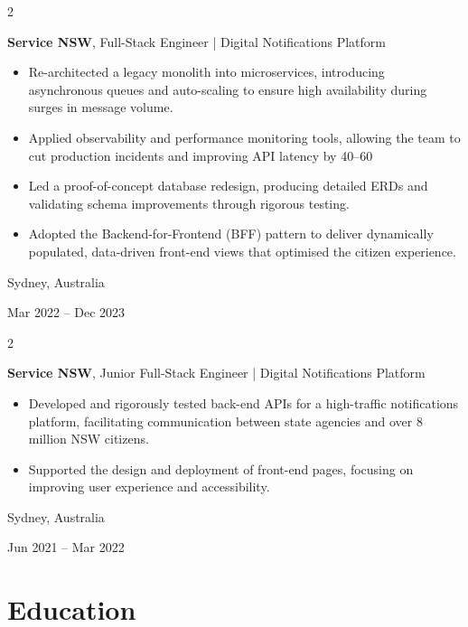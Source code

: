 \documentclass[10pt, a4paper]{article}
\newenvironment{highlights}{
    \begin{itemize}[
        topsep=0.10 cm,
        parsep=0.10 cm,
        partopsep=0pt,
        itemsep=0pt,
        leftmargin=0.4 cm + 10pt
    ]
}{
    \end{itemize}
} %
\newenvironment{twocolentry}[2][]{
    \onecolentry
    \def\secondColumn{#2}
    \setcolumnwidth{\fill, 4.5 cm}
    \begin{paracol}{2}
}{
    \switchcolumn \raggedleft \secondColumn
    \end{paracol}
    \endonecolentry
} %
\begin{document}
        \vspace{0.2 cm}

        \begin{twocolentry}{
            Sydney, Australia

        Mar 2022 – Dec 2023
        }
            \textbf{Service NSW}, Full-Stack Engineer | Digital Notifications Platform
            \begin{highlights}
                \item Re-architected a legacy monolith into microservices, introducing asynchronous queues and auto-scaling to ensure high availability during surges in message volume.
                \item Applied observability and performance monitoring tools, allowing the team to cut production incidents and improving API latency by 40–60%
                \item Led a proof-of-concept database redesign, producing detailed ERDs and validating schema improvements through rigorous testing.
                \item Adopted the Backend-for-Frontend (BFF) pattern to deliver dynamically populated, data-driven front-end views that optimised the citizen experience.
            \end{highlights}
        \end{twocolentry}

        \vspace{0.2 cm}

        \begin{twocolentry}{
            Sydney, Australia

        Jun 2021 – Mar 2022
        }
            \textbf{Service NSW}, Junior Full-Stack Engineer | Digital Notifications Platform
            \begin{highlights}
                \item Developed and rigorously tested back-end APIs for a high-traffic notifications platform, facilitating communication between state agencies and over 8 million NSW citizens.
                \item Supported the design and deployment of front-end pages, focusing on improving user experience and accessibility.
            \end{highlights}
        \end{twocolentry}
    
    \section{Education}
\end{document}
